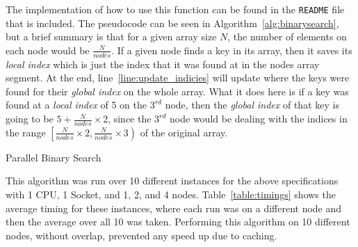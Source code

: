 \documentclass[addpoints]{exam}
\begin{document}
\begin{questions}
\begin{solution}
The implementation of how to use this function can be found in the {\tt README} file that is included. The pseudocode can be seen in Algorithm~\ref{alg:binarysearch}, but a brief summary is that for a given array size $N$, the number of elements on each node would be $\frac{N}{nodes}$. If a given node finds a key in its array, then it saves its {\em local index} which is just the index that it was found at in the nodes array segment. At the end, line~\ref{line:update_indicies} will update where the keys were found for their {\em global index} on the whole array. What it does here is if a key was found at a {\em local index} of 5 on the $3^{rd}$ node, then the {\em global index} of that key is going to be $5 + \frac{N}{nodes}\times 2$, since the $3^{rd}$ node would be dealing with the indices in the range $\left[ \frac{N}{nodes}\times 2, \frac{N}{nodes}\times 3\right)$ of the original array.  

\begin{algorithm}[H]
\centering
\caption{Parallel Binary Search}
\begin{algorithmic}[1]
        \ELSE
           \ELSE
           \ENDIF
        \ENDIF
    \ENDFOR
\ENDFOR
{}\label{line:update_indicies}
\end{algorithmic}
\label{alg:binarysearch}
\end{algorithm}

This algorithm was run over 10 different instances for the above specifications with 1 CPU, 1 Socket, and 1, 2, and 4 nodes. Table~\ref{table:timings} shows the average timing for these instances, where each run was on a different node and then the average over all 10 was taken. Performing this algorithm on 10 different nodes, without overlap, prevented any speed up due to caching. 


\end{solution}
\end{questions}
\end{document}

